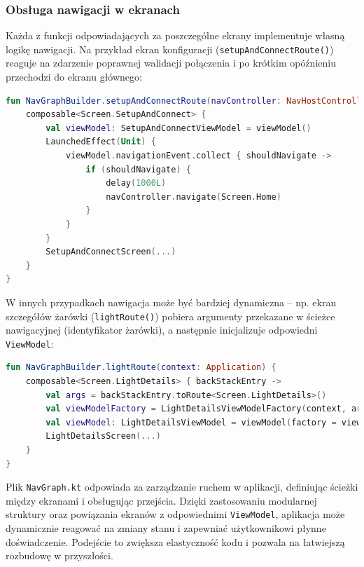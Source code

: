 \documentclass[12pt]{article}
\begin{document}
\subsubsection*{Obsługa nawigacji w ekranach}
Każda z funkcji odpowiadających za poszczególne ekrany implementuje własną logikę nawigacji. Na przykład ekran konfiguracji (\texttt{setupAndConnectRoute()}) reaguje
na zdarzenie poprawnej walidacji połączenia i po krótkim opóźnieniu przechodzi do ekranu głównego:

\begin{lstlisting}[language=Kotlin]
fun NavGraphBuilder.setupAndConnectRoute(navController: NavHostController) {
    composable<Screen.SetupAndConnect> {
        val viewModel: SetupAndConnectViewModel = viewModel()
        LaunchedEffect(Unit) {
            viewModel.navigationEvent.collect { shouldNavigate ->
                if (shouldNavigate) {
                    delay(1000L)
                    navController.navigate(Screen.Home)
                }
            }
        }
        SetupAndConnectScreen(...)
    }
}
\end{lstlisting}

W innych przypadkach nawigacja może być bardziej dynamiczna – np. ekran szczegółów żarówki (\texttt{lightRoute()}) pobiera argumenty przekazane w ścieżce nawigacyjnej
(identyfikator żarówki), a następnie inicjalizuje odpowiedni \texttt{ViewModel}:

\begin{lstlisting}[language=Kotlin]
fun NavGraphBuilder.lightRoute(context: Application) {
    composable<Screen.LightDetails> { backStackEntry ->
        val args = backStackEntry.toRoute<Screen.LightDetails>()
        val viewModelFactory = LightDetailsViewModelFactory(context, args.rid)
        val viewModel: LightDetailsViewModel = viewModel(factory = viewModelFactory)
        LightDetailsScreen(...)
    }
}
\end{lstlisting}
Plik \texttt{NavGraph.kt} odpowiada za zarządzanie ruchem w aplikacji, definiując ścieżki między ekranami i obsługując przejścia. Dzięki zastosowaniu modularnej struktury
oraz powiązania ekranów z odpowiednimi \texttt{ViewModel}, aplikacja może dynamicznie reagować na zmiany stanu i zapewniać użytkownikowi płynne doświadczenie. Podejście to
zwiększa elastyczność kodu i pozwala na łatwiejszą rozbudowę w przyszłości.
\end{document}
